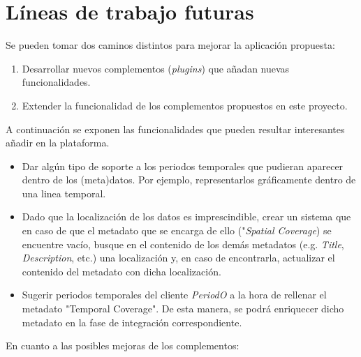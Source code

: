 \documentclass[
]{article}
\providecommand{\tightlist}{%
  \setlength{\itemsep}{0pt}\setlength{\parskip}{0pt}}
\begin{document}
\hypertarget{luxedneas-de-trabajo-futuras}{%
\section{Líneas de trabajo futuras}\label{luxedneas-de-trabajo-futuras}}

Se pueden tomar dos caminos distintos para mejorar la aplicación
propuesta:

\begin{enumerate}
\def\labelenumi{\arabic{enumi}.}
\tightlist
\item
  Desarrollar nuevos complementos (\emph{plugins}) que añadan nuevas
  funcionalidades.
\item
  Extender la funcionalidad de los complementos propuestos en este
  proyecto.
\end{enumerate}

A continuación se exponen las funcionalidades que pueden resultar
interesantes añadir en la plataforma.

\begin{itemize}
\tightlist
\item
  Dar algún tipo de soporte a los periodos temporales que pudieran
  aparecer dentro de los (meta)datos. Por ejemplo, representarlos
  gráficamente dentro de una linea temporal.
\item
  Dado que la localización de los datos es imprescindible, crear un
  sistema que en caso de que el metadato que se encarga de ello
  ("\emph{Spatial Coverage}) se encuentre vacío, busque en el contenido
  de los demás metadatos (e.g. \emph{Title}, \emph{Description}, etc.)
  una localización y, en caso de encontrarla, actualizar el contenido
  del metadato con dicha localización.
\item
  Sugerir periodos temporales del cliente \emph{PeriodO} a la hora de
  rellenar el metadato "Temporal Coverage". De esta manera, se podrá
  enriquecer dicho metadato en la fase de integración correspondiente.
\end{itemize}

En cuanto a las posibles mejoras de los complementos:
\end{document}

